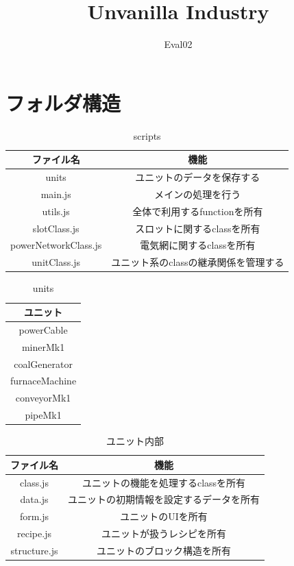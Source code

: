 \documentclass[uplatex,dvipdfmx,report]{jlreq}
\title{Unvanilla Industry}
\author{Eval02}
\begin{document}
\maketitle

\chapter{フォルダ構造}
\begin{table}[H]
    \centering
    \caption{scripts}
    \begin{tabular}{cc}
        \hline
        ファイル名 & 機能 \\
        \hline
        \hline
        units & ユニットのデータを保存する \\
        main.js & メインの処理を行う \\
        utils.js & 全体で利用するfunctionを所有 \\
        slotClass.js & スロットに関するclassを所有 \\
        powerNetworkClass.js & 電気網に関するclassを所有 \\
        unitClass.js & ユニット系のclassの継承関係を管理する \\
        \hline
    \end{tabular}
\end{table}

\begin{table}[H]
    \centering
    \caption{units}
    \begin{tabular}{c}
        \hline
        ユニット\\
        \hline
        \hline
        powerCable \\
        minerMk1 \\
        coalGenerator \\
        furnaceMachine \\
        conveyorMk1 \\
        pipeMk1 \\
        \hline
    \end{tabular}
\end{table}

\begin{table}[H]
    \centering
    \caption{ユニット内部}
    \begin{tabular}{cc}
        \hline
        ファイル名 & 機能 \\
        \hline
        \hline
        class.js & ユニットの機能を処理するclassを所有 \\
        data.js & ユニットの初期情報を設定するデータを所有 \\
        form.js & ユニットのUIを所有 \\
        recipe.js & ユニットが扱うレシピを所有 \\
        structure.js & ユニットのブロック構造を所有 \\
        \hline
    \end{tabular}
\end{table}
\end{document}
